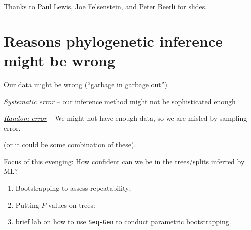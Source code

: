 \documentclass[landscape]{foils}
\begin{document}
\myNewSlide
\huge 
Thanks to Paul Lewis, Joe Felsenstein, and Peter Beerli for slides.

\myNewSlide
\section*{Reasons phylogenetic inference might be wrong}
\Large
\begin{compactenum}
	\item Our data might be wrong (``garbage in garbage out'')
	\item {\em Systematic error} -- our inference method might not be sophisticated enough
	\item \underline{{\em Random error}} -- We might not have enough data, so we are misled by sampling error.
\end{compactenum}

(or it could be some combination of these).

{Focus of this evenging: How confident can we be in the trees/splits inferred by ML?}

\myNewSlide
\begin{enumerate}
	\item Bootstrapping to assess repeatability;
	\item Putting $P$-values on trees:
	\item brief lab on how to use {\tt Seq-Gen} to conduct parametric bootstrapping.
\end{enumerate}


\myNewSlide
 

\myNewSlide
 
\end{document}
